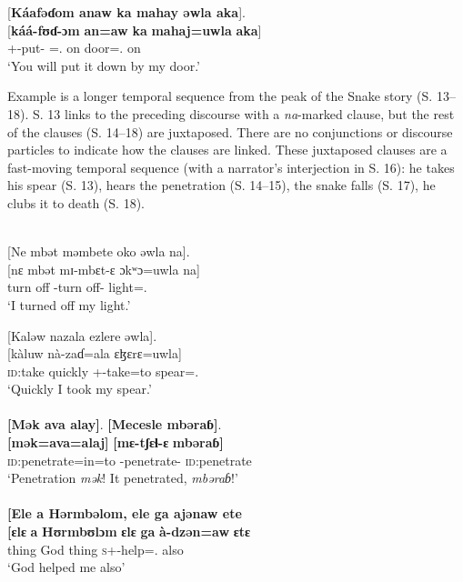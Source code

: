 \medskip
\clearpage
{}[\textbf{Káafəɗom  anaw  ka  mahay  əwla  aka}].\\
\gll {}[\textbf{káá-fʊɗ-ɔm} \textbf{an=aw}   \textbf{ka}  \textbf{mahaj}\textbf{=uwla}   \textbf{aka}]\\
     {\twoP}+{\POT}-put-{\twoP}   {\DAT}={\oneS}.{\IO}  on  door={\oneS}.{\POSS}  on\\ 
\glt  ‘You will put it down by my door.’
\z 

Example  is a longer temporal sequence from the peak of the Snake story (S. 13--18). S. 13 links to the preceding discourse with a \textit{na}{}-marked clause, but the rest of the clauses (S. 14--18) are juxtaposed. There are no conjunctions or discourse particles to indicate how the clauses are linked. These juxtaposed clauses are a fast-moving temporal sequence (with a narrator's interjection in S. 16): he takes his spear (S. 13), hears the penetration (S. 14--15), the snake falls (S. 17), he clubs it to death (S. 18). 

\ea \label{ex:12:67}\\
{}[Ne  mbət  məmbete  oko  əwla  na]. \\ 
\gll  {}[nɛ mbət mɪ-mbɛt-ɛ ɔkʷɔ=uwla na] \\     
      {\oneS}  {turn off}  {\NOM}{}-{turn off}-{\CL}     {light}={\oneS}.{\POSS}  {\PSP}\\ 
 \glt  ‘I turned off my light.'
      
      \medskip
{}[Kaləw  nazala  ezlere  əwla]. \\      
\gll  {}[kàluw nà-zaɗ=ala ɛɮɛrɛ=uwla]\\     
     {\textsc{id}:take quickly}    {\oneS}+{\PFV}-take=to   spear={\oneS}.{\POSS} \\
\glt ‘Quickly I took my spear.’\\

\medskip
{}\\
{}\textbf{[Mək  ava  alay]}.  \textbf{[Mecesle  mbəraɓ]}.\\ 
\gll  \textbf{[mək}\textbf{=ava}\textbf{=alaj]} \textbf{[mɛ-tʃɛɬ-ɛ}  \textbf{mbəraɓ]} \\ 
      {\textsc{id}:penetrate}{=in}{=to}      {\NOM}{}-penetrate-{\CL}    {\textsc{id}:penetrate} \\     
\glt  ‘Penetration \textit{mək}! It penetrated, \textit{mbəraɓ}!’\\ 

\medskip
{}\\
{}\textbf{[Ele  a  Hərmbəlom,  ele  ga  ajənaw  ete}\\ 
\gll \textbf{[ɛlɛ} \textbf{a}   \textbf{Hʊrmbʊlɔm}   \textbf{ɛlɛ}  \textbf{ga}  \textbf{à-dzən=aw} \textbf{ɛtɛ}\\        
     {thing}   {\GEN}   {God}      {thing}  {\ADJ}   \textsc{s}+{\PFV}-help={\oneS}.{\IO}    {also} \\       
\glt ‘God helped me also’\\ 

